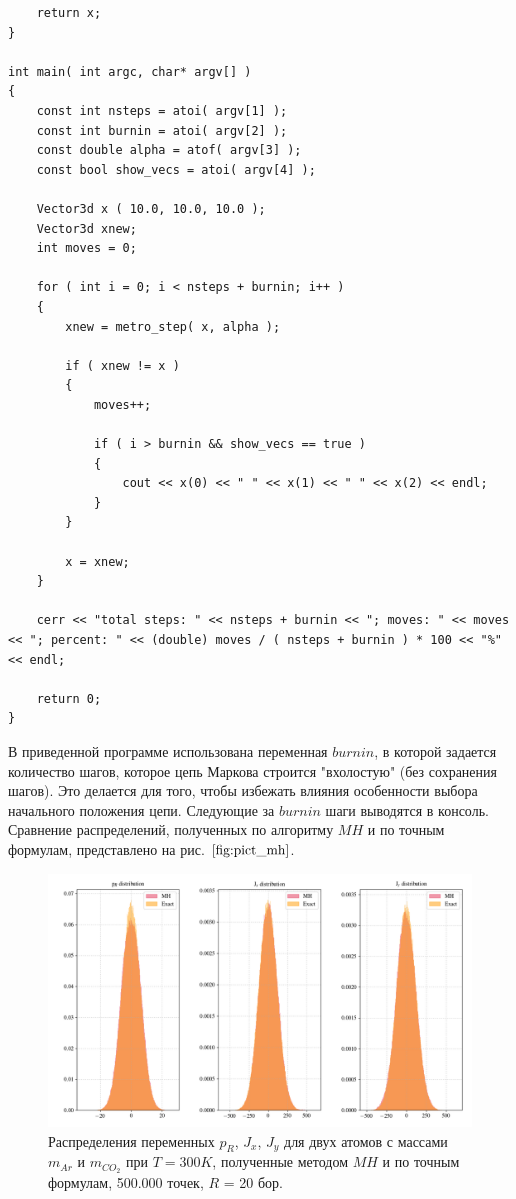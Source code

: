 \begin{lstlisting}
    return x;
}

int main( int argc, char* argv[] )
{
    const int nsteps = atoi( argv[1] );
    const int burnin = atoi( argv[2] );
    const double alpha = atof( argv[3] ); 
    const bool show_vecs = atoi( argv[4] );

    Vector3d x ( 10.0, 10.0, 10.0 );
    Vector3d xnew;
    int moves = 0;

    for ( int i = 0; i < nsteps + burnin; i++ )
    {
        xnew = metro_step( x, alpha );

        if ( xnew != x )
        {
            moves++;

            if ( i > burnin && show_vecs == true )
            {
                cout << x(0) << " " << x(1) << " " << x(2) << endl;
            }
        }

        x = xnew;
    }

    cerr << "total steps: " << nsteps + burnin << "; moves: " << moves << "; percent: " << (double) moves / ( nsteps + burnin ) * 100 << "%" << endl;

    return 0;
}
\end{lstlisting}

В приведенной программе использована переменная $burnin$, в которой задается количество шагов, которое цепь Маркова строится "вхолостую" (без сохранения шагов). Это делается для того, чтобы избежать влияния особенности выбора начального положения цепи. Следующие за $burnin$ шаги выводятся в консоль.
Сравнение распределений, полученных по алгоритму $MH$ и по точным формулам, представлено на рис. $\ref{fig:pict_mh}$. 

\begin{figure}[ht!]
	\includegraphics[width=\textwidth]{../pictures/diatomicsMHExactDistributions.png}
	\caption{Распределения переменных $p_R$, $J_x$, $J_y$ для двух атомов с массами $m_{Ar}$ и $m_{CO_2}$ при $T = 300 K$, полученные методом $MH$ и по точным формулам, 500.000 точек, $R$ = 20 бор.}
	\label{fig:pict_mh}
\end{figure}

